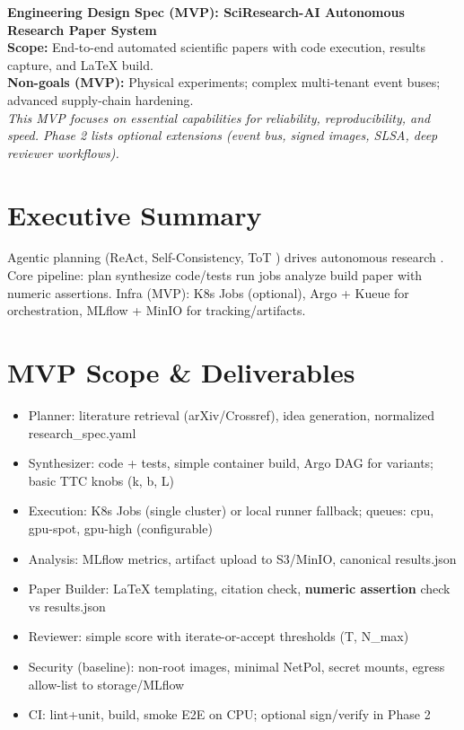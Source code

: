 \begin{center}
{\LARGE \textbf{Engineering Design Spec (MVP): SciResearch-AI Autonomous Research Paper System}}\\[6pt]
\textbf{Scope:} End-to-end automated scientific papers with code execution, results capture, and LaTeX build.\\[2pt]
\textbf{Non-goals (MVP):} Physical experiments; complex multi-tenant event buses; advanced supply-chain hardening.\\[4pt]
\textit{This MVP focuses on essential capabilities for reliability, reproducibility, and speed. Phase 2 lists optional extensions (event bus, signed images, SLSA, deep reviewer workflows).}
\end{center}

\section{Executive Summary}
Agentic planning (ReAct, Self-Consistency, ToT \cite{yao2023react,wang2022selfconsistency,yao2023tot}) drives autonomous research \cite{lu2024aiscientist}. Core pipeline: plan \textrightarrow{} synthesize code/tests \textrightarrow{} run jobs \textrightarrow{} analyze \textrightarrow{} build paper with numeric assertions. Infra (MVP): K8s Jobs (optional), Argo + Kueue for orchestration, MLflow + MinIO for tracking/artifacts.

\section{MVP Scope \& Deliverables}
\begin{itemize}[leftmargin=1.4em]
  \item Planner: literature retrieval (arXiv/Crossref), idea generation, normalized research\_spec.yaml
  \item Synthesizer: code + tests, simple container build, Argo DAG for variants; basic TTC knobs (k, b, L)
  \item Execution: K8s Jobs (single cluster) or local runner fallback; queues: cpu, gpu-spot, gpu-high (configurable)
  \item Analysis: MLflow metrics, artifact upload to S3/MinIO, canonical results.json
  \item Paper Builder: LaTeX templating, citation check, \textbf{numeric assertion} check vs results.json
  \item Reviewer: simple score with iterate-or-accept thresholds (T, N\_max)
  \item Security (baseline): non-root images, minimal NetPol, secret mounts, egress allow-list to storage/MLflow
  \item CI: lint+unit, build, smoke E2E on CPU; optional sign/verify in Phase 2
\end{itemize}

